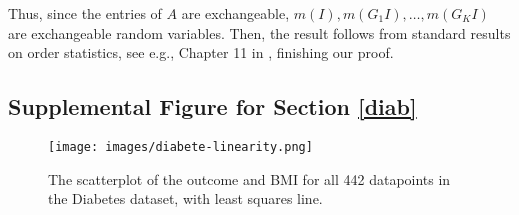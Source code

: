 \documentclass[english]{article}
\begin{document}
    Thus, since the entries of $A$ are exchangeable, $m(I),m(G_1I),\ldots,m(G_KI)$ are exchangeable random variables.
    Then, 
    the result follows 
    from 
    standard results on order statistics,
    see e.g., Chapter 11 in \cite{vovk2022algorithmic}, finishing our proof.
    
    

\subsection{Supplemental Figure for Section \ref{diab}}\label{sec:diab-supp}
\begin{figure}[ht]
    \centering
    \texttt{[image: images/diabete-linearity.png]}
  \caption{
  The scatterplot of the outcome and BMI for all 442 datapoints in the Diabetes dataset, with least squares line.}
  \label{fig:diabete-JCR-supp}
\end{figure}
\end{document}
